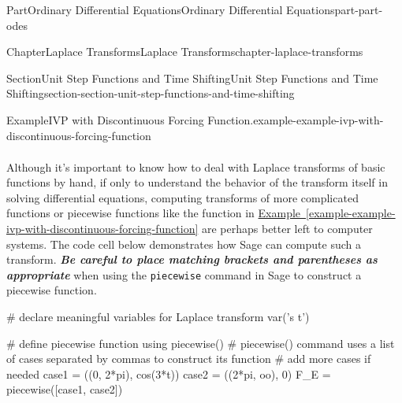 \documentclass[twoside,10pt,]{book}
\newcommand{\xreffont}{\relax}
\newcommand{\mono}[1]{\texttt{#1}}
\newcommand{\alert}[1]{\textbf{\textit{#1}}}
\numberwithin{equation}{part}
\begin{document}
\begin{partptx}{Part}{Ordinary Differential Equations}{}{Ordinary Differential Equations}{}{}{part-part-odes}
\begin{chapterptx}{Chapter}{Laplace Transforms}{}{Laplace Transforms}{}{}{chapter-laplace-transforms}
\begin{sectionptx}{Section}{Unit Step Functions and Time Shifting}{}{Unit Step Functions and Time Shifting}{}{}{section-section-unit-step-functions-and-time-shifting}
\begin{example}{Example}{IVP with Discontinuous Forcing Function.}{example-example-ivp-with-discontinuous-forcing-function}
\begin{align*}
\end{align*}
%
\end{example}
Although it's important to know how to deal with Laplace transforms of basic functions by hand, if only to understand the behavior of the transform itself in solving differential equations, computing transforms of more complicated functions or piecewise functions like the function in \hyperref[example-example-ivp-with-discontinuous-forcing-function]{Example~{\xreffont\ref{example-example-ivp-with-discontinuous-forcing-function}}} are perhaps better left to computer systems. The code cell below demonstrates how Sage can compute such a transform. \alert{Be careful to place matching brackets and parentheses as appropriate} when using the \mono{piecewise} command in Sage to construct a piecewise function.%
\begin{sageinput}
# declare meaningful variables for Laplace transform
var('s t')

# define piecewise function using piecewise()
# piecewise() command uses a list of cases separated by commas to construct its function
# add more cases if needed
case1 = ((0, 2*pi), cos(3*t))
case2 = ((2*pi, oo), 0)
F_E = piecewise([case1, case2])


\end{sageinput}
\end{sectionptx}
\end{chapterptx}
\end{partptx}
\end{document}
